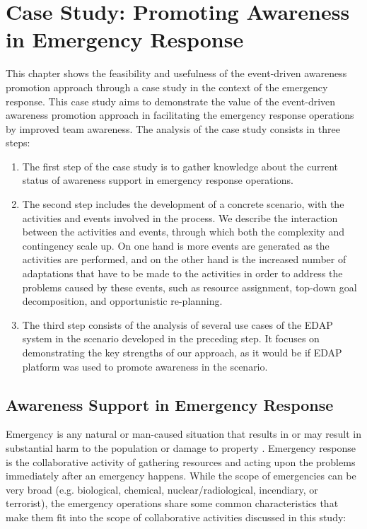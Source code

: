 \graphicspath{{Figures/}}

\chapter{Case Study: Promoting Awareness in Emergency Response} %
\label{cha:case_studies}

This chapter shows the feasibility and usefulness of the event-driven awareness promotion approach through a case study in the context of the emergency response. This case study aims to demonstrate the value of the event-driven awareness promotion approach in facilitating the emergency response operations by improved team awareness. The analysis of the case study consists in three steps:

\begin{enumerate}
	\item The first step of the case study is to gather knowledge about the current status of awareness support in emergency response operations.
	\item The second step includes the development of a concrete scenario, with the activities and events involved in the process. We describe the interaction between the activities and events, through which both the complexity and contingency scale up. On one hand is more events are generated as the activities are performed, and on the other hand is the increased number of adaptations that have to be made to the activities in order to address the problems caused by these events, such as resource assignment, top-down goal decomposition, and opportunistic re-planning.
	\item The third step consists of the analysis of several use cases of the EDAP system in the scenario developed in the preceding step. It focuses on demonstrating the key strengths of our approach, as it would be if EDAP platform was used to promote awareness in the scenario.
\end{enumerate}

\section{Awareness Support in Emergency Response} %
\label{sec:awareness_support_in_emergency_response}
Emergency is any natural or man-caused situation that results in or may result in substantial harm to the population or damage to property \cite{shen2004managing}. Emergency response is the collaborative activity of gathering resources and acting upon the problems immediately after an emergency happens. While the scope of emergencies can be very broad (e.g. biological, chemical, nuclear/radiological, incendiary, or terrorist), the emergency operations share some common characteristics that make them fit into the scope of collaborative activities discussed in this study:

